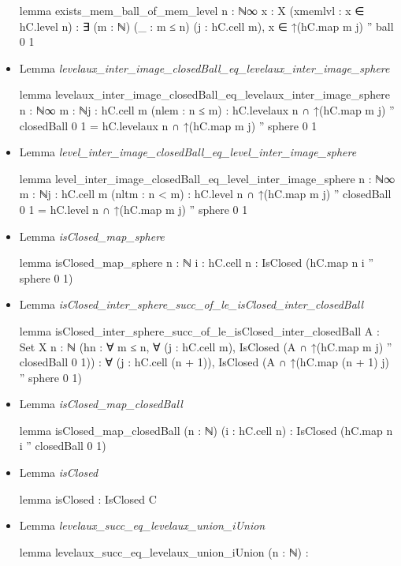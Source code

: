 \documentclass[colorinlistoftodos]{article}
\begin{document}
\begin{itemize}
\begin{leancode}
lemma exists_mem_ball_of_mem_level {n : ℕ∞} {x : X} (xmemlvl : x ∈ hC.level n) : 
  ∃ (m : ℕ) (_ : m ≤ n) (j : hC.cell m), x ∈ ↑(hC.map m j) '' ball 0 1
\end{leancode}
  \item Lemma \emph{levelaux\_inter\_image\_closedBall\_eq\_levelaux\_inter\_image\_sphere}
\begin{leancode}
lemma levelaux_inter_image_closedBall_eq_levelaux_inter_image_sphere 
{n : ℕ∞} {m : ℕ}{j : hC.cell m} (nlem : n ≤ m) :
  hC.levelaux n ∩ ↑(hC.map m j) '' closedBall 0 1 = 
  hC.levelaux n ∩ ↑(hC.map m j) '' sphere 0 1
\end{leancode}
  \item Lemma \emph{level\_inter\_image\_closedBall\_eq\_level\_inter\_image\_sphere}
\begin{leancode}
lemma level_inter_image_closedBall_eq_level_inter_image_sphere 
{n : ℕ∞} {m : ℕ}{j : hC.cell m} (nltm : n < m) : 
  hC.level n ∩ ↑(hC.map m j) '' closedBall 0 1 = 
  hC.level n ∩ ↑(hC.map m j) '' sphere 0 1
\end{leancode}
  \item Lemma \emph{isClosed\_map\_sphere}
\begin{leancode}
lemma isClosed_map_sphere {n : ℕ} {i : hC.cell n} : IsClosed (hC.map n i '' sphere 0 1)
\end{leancode}
  \item Lemma \emph{isClosed\_inter\_sphere\_succ\_of\_le\_isClosed\_inter\_closedBall}
\begin{leancode}
lemma isClosed_inter_sphere_succ_of_le_isClosed_inter_closedBall
{A : Set X} {n : ℕ}
(hn : ∀ m ≤ n, ∀ (j : hC.cell m), IsClosed (A ∩ ↑(hC.map m j) '' closedBall 0 1)) : 
∀ (j : hC.cell (n + 1)), IsClosed (A ∩ ↑(hC.map (n + 1) j) '' sphere 0 1)
\end{leancode}
  \item Lemma \emph{isClosed\_map\_closedBall}
\begin{leancode}
lemma isClosed_map_closedBall (n : ℕ) (i : hC.cell n) : 
  IsClosed (hC.map n i '' closedBall 0 1)
\end{leancode}
  \item Lemma \emph{isClosed}
\begin{leancode}
lemma isClosed : IsClosed C
\end{leancode}
  \item Lemma \emph{levelaux\_succ\_eq\_levelaux\_union\_iUnion}
\begin{leancode}
lemma levelaux_succ_eq_levelaux_union_iUnion (n : ℕ) : 

\end{leancode}
\end{itemize}
\end{document}
